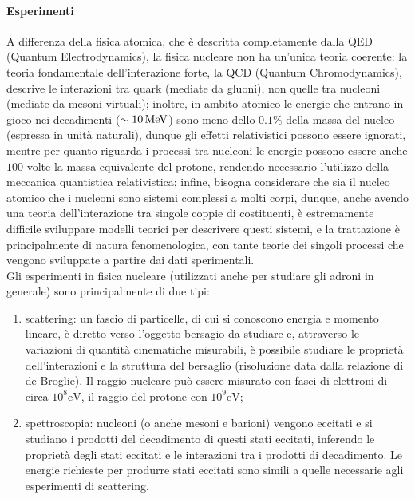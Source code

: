 \paragraph{Esperimenti}

A differenza della fisica atomica, che è descritta completamente dalla QED (Quantum Electrodynamics), la fisica nucleare non ha un'unica teoria coerente: la teoria fondamentale dell'interazione forte, la QCD (Quantum Chromodynamics), descrive le interazioni tra quark (mediate da gluoni), non quelle tra nucleoni (mediate da mesoni virtuali); inoltre, in ambito atomico le energie che entrano in gioco nei decadimenti ($ \sim 10\,\text{MeV} $) sono meno dello $ 0.1\% $ della massa del nucleo (espressa in unità naturali), dunque gli effetti relativistici possono essere ignorati, mentre per quanto riguarda i processi tra nucleoni le energie possono essere anche $ 100 $ volte la massa equivalente del protone, rendendo necessario l'utilizzo della meccanica quantistica relativistica; infine, bisogna considerare che sia il nucleo atomico che i nucleoni sono sistemi complessi a molti corpi, dunque, anche avendo una teoria dell'interazione tra singole coppie di costituenti, è estremamente difficile sviluppare modelli teorici per descrivere questi sistemi, e la trattazione è principalmente di natura fenomenologica, con tante teorie dei singoli processi che vengono sviluppate a partire dai dati sperimentali.\\
Gli esperimenti in fisica nucleare (utilizzati anche per studiare gli adroni in generale) sono principalmente di due tipi:
\begin{enumerate}
  \item scattering: un fascio di particelle, di cui si conoscono energia e momento lineare, è diretto verso l'oggetto bersagio da studiare e, attraverso le variazioni di quantità cinematiche misurabili, è possibile studiare le proprietà dell'interazioni e la struttura del bersaglio (risoluzione data dalla relazione di de Broglie). Il raggio nucleare può essere misurato con fasci di elettroni di circa $10^8 \text{eV}$, il raggio del protone con $10^9 \text{eV}$;
  \item spettroscopia: nucleoni (o anche mesoni e barioni) vengono eccitati e si studiano i prodotti del decadimento di questi stati eccitati, inferendo le proprietà degli stati eccitati e le interazioni tra i prodotti di decadimento. Le energie richieste per produrre stati eccitati sono simili a quelle necessarie agli esperimenti di scattering.
\end{enumerate}
